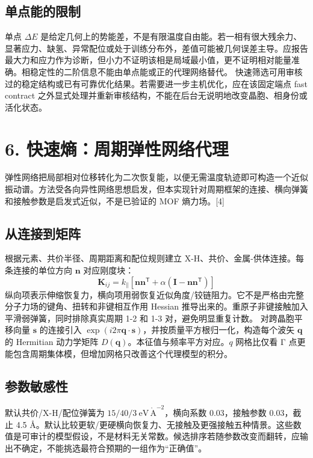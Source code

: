 \documentclass[UTF8,a4paper,11pt]{ctexart}
\begin{document}
\subsection*{单点能的限制}
单点 \(\Delta E\) 是给定几何上的势能差，不是有限温度自由能。若一相有很大残余力、显著应力、缺氢、异常配位或处于训练分布外，差值可能被几何误差主导。应报告最大力和应力作为诊断，但小力不证明该相是局域最小值，更不证明相对能量准确。相稳定性的二阶信息不能由单点能或正的代理网络替代。
快速筛选可用审核过的稳定结构或已有可靠优化结果。若需要进一步主机优化，应在该固定端点 fast contract 之外显式处理并重新审核结构，不能在后台无说明地改变晶胞、相身份或活化状态。
\clearpage
\section*{6. 快速熵：周期弹性网络代理}
弹性网络把局部相对位移转化为二次恢复能，以便无需温度轨迹即可构造一个近似振动谱。方法受各向异性网络思想启发，但本实现针对周期框架的连接、横向弹簧和接触参数是启发式近似，不是已验证的 MOF 熵力场。[4]
\subsection*{从连接到矩阵}
根据元素、共价半径、周期距离和配位规则建立 X-H、共价、金属-供体连接。每条连接的单位方向 \(\mathbf n\) 对应刚度块：
\begin{equation*}
\mathbf K_{ij}=k_{\parallel}\left[\mathbf n\mathbf n^{\mathsf T}+\alpha\left(\mathbf I-\mathbf n\mathbf n^{\mathsf T}\right)\right]
\end{equation*}
纵向项表示伸缩恢复力，横向项用弱恢复近似角度/铰链阻力。它不是严格由完整分子力场的键角、扭转和非键相互作用 Hessian 推导出来的。重原子非键接触加入平滑弱弹簧，同时排除真实周期 1-2 和 1-3 对，避免明显重复计数。
对跨晶胞平移向量 \(\mathbf s\) 的连接引入 \(\exp(i2\pi\mathbf q\cdot\mathbf s)\)，并按质量平方根归一化，构造每个波矢 \(\mathbf q\) 的 Hermitian 动力学矩阵 \(D(\mathbf q)\)。本征值与频率平方对应。\(q\) 网格比仅看 Γ 点更能包含周期集体模，但增加网格只改善这个代理模型的积分。
\subsection*{参数敏感性}
默认共价/X-H/配位弹簧为 \(15/40/3\ \mathrm{eV\,\mathring A^{-2}}\)，横向系数 0.03，接触参数 0.03，截止 4.5 Å。默认比较更软/更硬横向恢复力、无接触及更强接触五种情景。这些数值是可审计的模型假设，不是材料无关常数。候选排序若随参数改变而翻转，应输出不确定，不能挑选最符合预期的一组作为“正确值”。
\clearpage
\end{document}

